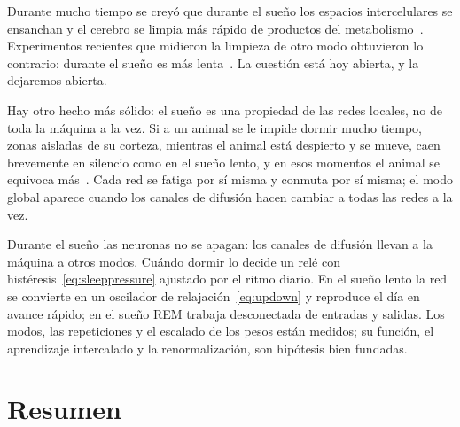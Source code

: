 Durante mucho tiempo se creyó que durante el sueño los espacios intercelulares se ensanchan y el cerebro se limpia más rápido de productos del metabolismo~\cite{Xie2013}. Experimentos recientes que midieron la limpieza de otro modo obtuvieron lo contrario: durante el sueño es más lenta~\cite{Miao2024}. La cuestión está hoy abierta, y la dejaremos abierta.

Hay otro hecho más sólido: el sueño es una propiedad de las redes locales, no de toda la máquina a la vez. Si a un animal se le impide dormir mucho tiempo, zonas aisladas de su corteza, mientras el animal está despierto y se mueve, caen brevemente en silencio como en el sueño lento, y en esos momentos el animal se equivoca más~\cite{Vyazovskiy2011}. Cada red se fatiga por sí misma y conmuta por sí misma; el modo global aparece cuando los canales de difusión hacen cambiar a todas las redes a la vez.

\begin{keyblock}
\begin{proposition}
\label{prop:sleep}
Durante el sueño las neuronas no se apagan: los canales de difusión llevan a la máquina a otros modos. Cuándo dormir lo decide un relé con histéresis~\eqref{eq:sleeppressure} ajustado por el ritmo diario. En el sueño lento la red se convierte en un oscilador de relajación~\eqref{eq:updown} y reproduce el día en avance rápido; en el sueño REM trabaja desconectada de entradas y salidas. Los modos, las repeticiones y el escalado de los pesos están medidos; su función, el aprendizaje intercalado y la renormalización, son hipótesis bien fundadas.
\end{proposition}
\end{keyblock}

\section{Resumen}

